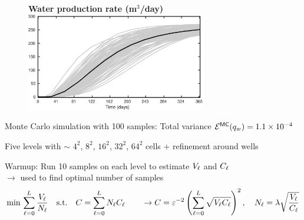 \begin{frame}{\name{}}
    \begin{figure}
        \centering
        \textbf{Water production rate (m$^3$/day)}
        \includegraphics[width = 0.7\textwidth]{figures/example-2/water-rate.eps}
    \end{figure}
    \begin{squarelist}
        \item Monte Carlo simulation with 100 samples: Total variance $\mathcal{E}^{\mathsf{MC}}(q_w) = 1.1\times10^{-4}$
    \end{squarelist}
\end{frame}

\begin{frame}{\name{}}
    \begin{figure}
        \centering
    \end{figure}
    \begin{squarelist}
        \item<1-> Five levels with $\sim$ $4^2$, $8^2$, $16^2$, $32^2$, $64^2$ cells + refinement around wells
        \item<2-> Warmup: Run 10 samples on each level to estimate $V_\ell$ and $C_\ell$ \\
        $\rightarrow$ used to find optimal number of samples
        \begin{equation*}
            \min\, \sum_{\ell = 0}^L\frac{V_\ell}{N_\ell} \quad \text{s.t.} \quad C = \sum_{\ell = 0}^L N_\ell C_\ell \qquad \rightarrow C = \varepsilon^{-2}\left(\sum_{\ell = 0}^L \sqrt{V_\ell C_\ell}\right)^2, \quad N_\ell = \lambda\sqrt{\frac{V_\ell}{C_\ell}}
\end{equation*}
    \end{squarelist}
\end{frame}

